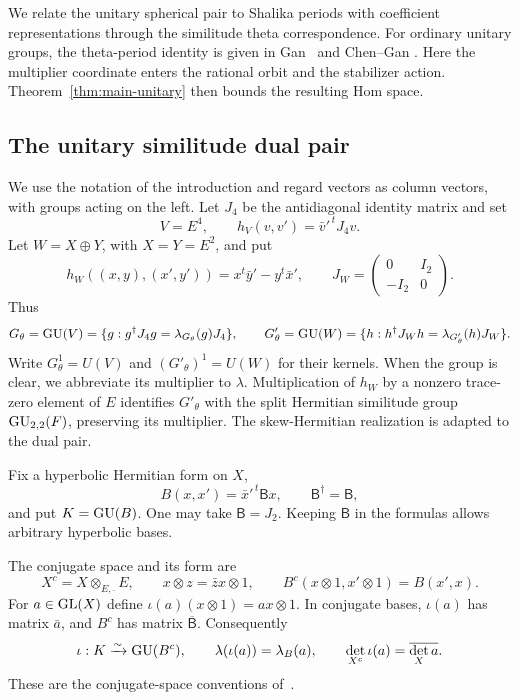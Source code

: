 We relate the unitary spherical pair to Shalika periods with
coefficient representations through the similitude theta correspondence. For ordinary
unitary groups, the theta-period identity is given in
Gan~\cite[\S2]{GanPeriods} and Chen--Gan
\cite[\S3, Proposition~3.4 and Theorem~3.5]{ChenGan}.
Here the multiplier coordinate enters the rational orbit and the
stabilizer action. Theorem~\ref{thm:main-unitary} then bounds the
resulting Hom space.
\label{gu:sec:setup}

\subsection{The unitary similitude dual pair}
We use the notation of the introduction and regard vectors as column
vectors, with groups acting on the left. Let $J_4$ be the antidiagonal
identity matrix and set
\[
 V=E^4,\qquad h_V(v,v')=\bar v'^{\,t}J_4v.
\]
Let $W=X\oplus Y$, with $X=Y=E^2$, and put
\begin{equation}\label{gu:eq:W-form}
 h_W((x,y),(x',y'))=x^t\bar y'-y^t\bar x',
 \qquad J_W=\begin{pmatrix}0&I_2\\-I_2&0\end{pmatrix}.
\end{equation}
Thus
\[
 G_\theta=\operatorname{GU}(V)=\{g:g^\dagger J_4g=\lambda_{G_\theta}(g)J_4\},\qquad
 G'_\theta=\operatorname{GU}(W)=\{h:h^\dagger J_Wh=\lambda_{G'_\theta}(h)J_W\}.
\]
Write $G_\theta^1=U(V)$ and $(G'_\theta)^1=U(W)$ for their kernels. When the group is clear, we abbreviate its multiplier to $\lambda$. Multiplication of $h_W$ by a nonzero trace-zero element of $E$ identifies $G'_\theta$ with the split Hermitian similitude group $\operatorname{GU}_{2,2}(F)$, preserving its multiplier. The skew-Hermitian realization is adapted to the dual pair.

Fix a hyperbolic Hermitian form on $X$,
\[
 B(x,x')=\bar x'^{\,t}\mathsf Bx,\qquad \mathsf B^\dagger=\mathsf B,
\]
and put $K=\operatorname{GU}(B)$. One may take $\mathsf B=J_2$. Keeping $\mathsf B$ in the formulas allows arbitrary hyperbolic bases.

The conjugate space and its form are
\[
 X^c=X\otimes_{E,\bar{\ }}E,
 \qquad x\otimes z=\bar z x\otimes1,
 \qquad B^c(x\otimes1,x'\otimes1)=B(x',x).
\]
For $a\in\operatorname{GL}(X)$ define $\iota(a)(x\otimes1)=ax\otimes1$. In conjugate bases, $\iota(a)$ has matrix $\bar a$, and $B^c$ has matrix $\overline{\mathsf B}$. Consequently
\begin{equation}\label{gu:eq:iota-det}
 \iota:K\xrightarrow{\sim}\operatorname{GU}(B^c),\qquad
 \lambda(\iota(a))=\lambda_B(a),\qquad
 \det_{X^c}\iota(a)=\overline{\det_X a}.
\end{equation}
These are the conjugate-space conventions of~\cite[Sections~2.2--2.4]{ChenGan}.

